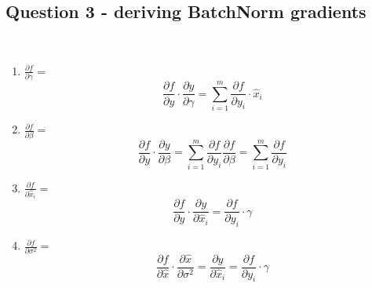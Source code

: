 \documentclass[10pt]{article}
\begin{document}
\subsection{Question 3 - deriving BatchNorm  gradients} 
\\
\begin{enumerate}[label=(\alph*)]
\item \textbf{$\frac{\partial f}{\partial \gamma} = $} \\
\begin{equation}
\frac{\partial f}{\partial y} \cdot \frac{\partial y}{\partial \gamma} =\sum_{i=1}^{m} \frac{\partial f}{\partial y_{i}} \cdot \widehat{x}_{i}
\end{equation}

\item \textbf{$\frac{\partial f}{\partial \beta} = $} \\
\begin{equation}
{\frac{\partial f}{\partial y} \cdot \frac{\partial y}{\partial \beta}}
{=\sum_{i=1}^{m} \frac{\partial f}{\partial y_{i}}} 
{\frac{\partial f}{\partial \beta}=\sum_{i=1}^{m} \frac{\partial f}{\partial y_{i}}}
\end{equation}

\item \textbf{$\frac{\partial f}{\partial \widehat{x}_{i}} = $} \\
\begin{equation}
{\frac{\partial f}{\partial y} \cdot \frac{\partial y}{\partial \widehat{x}_{i}}}
{=\frac{\partial f}{\partial y_{i}}} \cdot \gamma
\end{equation}

\item \textbf{$\frac{\partial f}{\partial \sigma^{2}} = $} \\
\begin{equation}
{\frac{\partial f}{\partial \widehat{x}} \cdot \frac{\partial \widehat{x}}{\partial  \sigma^{2}} =
\frac{\partial y}{\partial \widehat{x}_{i}}}
{=\frac{\partial f}{\partial y_{i}}} \cdot \gamma
\end{equation}


\end{enumerate}
\end{document}
